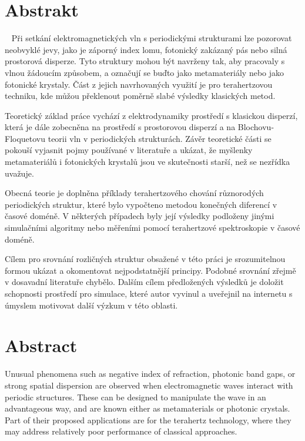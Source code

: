 
\vspace{-20mm}
\chapter*{Abstrakt}
\noindent ~
Při setkání elektromagnetických vln s periodickými strukturami lze pozorovat neobvyklé jevy, jako je záporný index lomu, fotonický zakázaný pás nebo silná prostorová disperze. Tyto struktury mohou být navrženy tak, aby pracovaly s vlnou žádoucím způsobem, a označují se buďto jako metamateriály nebo jako fotonické krystaly. Část z jejich navrhovaných využití je pro terahertzovou techniku, kde můžou překlenout poměrně slabé výsledky klasických metod.  

Teoretický základ práce vychází z elektrodynamiky prostředí s klasickou disperzí, která je dále zobecněna na prostředí s prostorovou disperzí a na Blochovu-Floquetovu teorii vln v periodických strukturách. Závěr teoretické části se pokouší vyjasnit pojmy používané v literatuře a ukázat, že myšlenky metamateriálů i fotonických krystalů jsou ve skutečnosti starší, než se nezřídka uvažuje.

Obecná teorie je doplněna příklady terahertzového chování různorodých periodických struktur, které bylo vypočteno metodou konečných diferencí v časové doméně. V některých případech byly její výsledky podloženy jinými simulačními algoritmy nebo měřeními pomocí terahertzové spektroskopie v časové doméně.

Cílem pro srovnání rozličných struktur obsažené v této práci je srozumitelnou formou ukázat a okomentovat nejpodstatnější principy. Podobné srovnání zřejmě v dosavadní literatuře chybělo. Dalším cílem předložených výsledků je doložit schopnosti prostředí pro simulace, které autor vyvinul a uveřejnil na internetu s úmyslem motivovat další výzkum v této oblasti. 

\vspace{0mm}
{\let\clearpage\relax\chapter*{Abstract}}
\noindent
Unusual phenomena such as negative index of refraction, photonic band gaps, or strong spatial dispersion are observed when electromagnetic waves interact with periodic structures. These can be designed to manipulate the wave in an advantageous way, and are known either as metamaterials or photonic crystals. Part of their proposed applications are for the terahertz technology, where they may address relatively poor performance of classical approaches.

